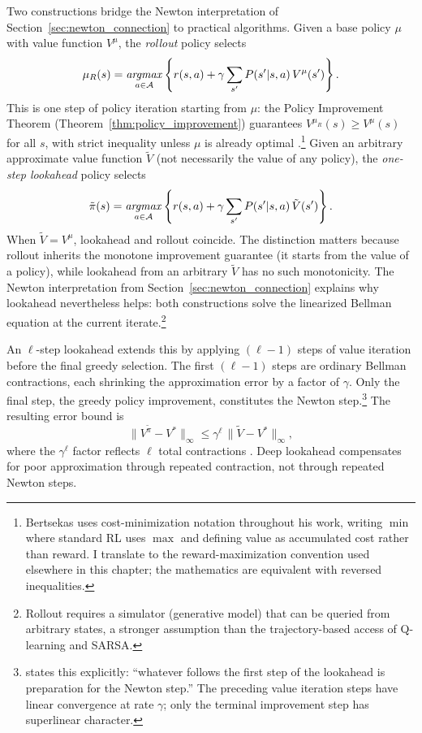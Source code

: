 Two constructions bridge the Newton interpretation of Section~\ref{sec:newton_connection} to practical algorithms. Given a base policy $\mu$ with value function $V^\mu$, the \emph{rollout} policy selects
\begin{equation}
\mu_R(s) = \mathop{\it argmax}_{a \in \mathcal{A}} \left\{ r(s,a) + \gamma \sum_{s'} P(s'|s,a)\, V^\mu(s') \right\}.
\end{equation}
This is one step of policy iteration starting from $\mu$: the Policy Improvement Theorem (Theorem~\ref{thm:policy_improvement}) guarantees $V^{\mu_R}(s) \geq V^\mu(s)$ for all $s$, with strict inequality unless $\mu$ is already optimal \citep{bertsekas2021lessons}.\footnote{Bertsekas uses cost-minimization notation throughout his work, writing $\min$ where standard RL uses $\max$ and defining value as accumulated cost rather than reward. I translate to the reward-maximization convention used elsewhere in this chapter; the mathematics are equivalent with reversed inequalities.} Given an arbitrary approximate value function $\tilde{V}$ (not necessarily the value of any policy), the \emph{one-step lookahead} policy selects
\begin{equation}
\tilde{\pi}(s) = \mathop{\it argmax}_{a \in \mathcal{A}} \left\{ r(s,a) + \gamma \sum_{s'} P(s'|s,a)\, \tilde{V}(s') \right\}.
\end{equation}
When $\tilde{V} = V^\mu$, lookahead and rollout coincide. The distinction matters because rollout inherits the monotone improvement guarantee (it starts from the value of a policy), while lookahead from an arbitrary $\tilde{V}$ has no such monotonicity. The Newton interpretation from Section~\ref{sec:newton_connection} explains why lookahead nevertheless helps: both constructions solve the linearized Bellman equation at the current iterate.\footnote{Rollout requires a simulator (generative model) that can be queried from arbitrary states, a stronger assumption than the trajectory-based access of Q-learning and SARSA.}

An $\ell$-step lookahead extends this by applying $(\ell - 1)$ steps of value iteration before the final greedy selection. The first $(\ell - 1)$ steps are ordinary Bellman contractions, each shrinking the approximation error by a factor of $\gamma$. Only the final step, the greedy policy improvement, constitutes the Newton step.\footnote{\citet{bertsekas2021lessons} states this explicitly: ``whatever follows the first step of the lookahead is preparation for the Newton step.'' The preceding value iteration steps have linear convergence at rate $\gamma$; only the terminal improvement step has superlinear character.} The resulting error bound is
\begin{equation}
\|V^{\tilde{\pi}} - V^*\|_\infty \leq \gamma^\ell \, \|\tilde{V} - V^*\|_\infty,
\end{equation}
where the $\gamma^\ell$ factor reflects $\ell$ total contractions \citep[Prop.~2.3.1]{bertsekas2022}. Deep lookahead compensates for poor approximation through repeated contraction, not through repeated Newton steps.

